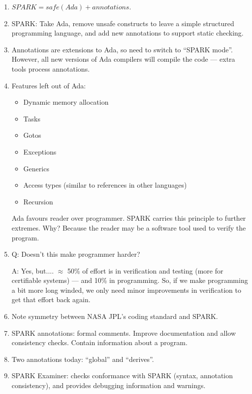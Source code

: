 \documentclass[11pt]{article}
\begin{document}
\begin{enumerate}

  \item  $SPARK = safe(Ada) + annotations$.

  \item SPARK: Take Ada, remove unsafe constructs to leave a simple structured programming language, and add new annotations to support static checking.

  \item Annotations are extensions to Ada, so need to switch to ``SPARK mode''. However, all new versions of Ada compilers will compile the code --- extra tools process annotations.

  \item Features left out of Ada: 
  \begin{itemize}
    \item Dynamic memory allocation
    \item Tasks
    \item Gotos
    \item Exceptions
    \item Generics
    \item Access types (similar to references in other languages)
    \item Recursion
  \end{itemize}

  Ada favours reader over programmer. SPARK carries this principle to further extremes. Why? Because the reader may be a software tool used to verify the program.

  \item Q: Doesn't this make programmer harder?

        A: Yes, but....  $\approx$ 50\% of effort is in verification and testing (more for certifiable systems) --- and 10\% in programming. So, if we make programming a bit more long winded, we only need minor improvements in verification to get that effort back again.

  \item Note symmetry between NASA JPL's coding standard and SPARK.

  \item SPARK annotations: formal comments. Improve documentation and allow consistency checks. Contain information about a program.

  \item Two annotations today: ``global'' and ``derives''.

  \item SPARK Examiner: checks conformance with SPARK (syntax, annotation consistency), and provides debugging information and warnings.


\end{enumerate}
\end{document}
